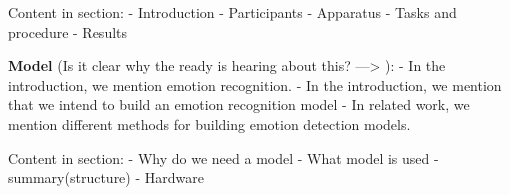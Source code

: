 Content in section:
- Introduction
- Participants
- Apparatus
- Tasks and procedure
- Results

\textbf{Model}
(Is it clear why the ready is hearing about this? ---> ):
    - In the introduction, we mention emotion recognition.
    - In the introduction, we mention that we intend to build an emotion recognition model
    - In related work, we mention different methods for building emotion detection models.

Content in section:
- Why do we need a model
- What model is used
    - summary(structure)
- Hardware


